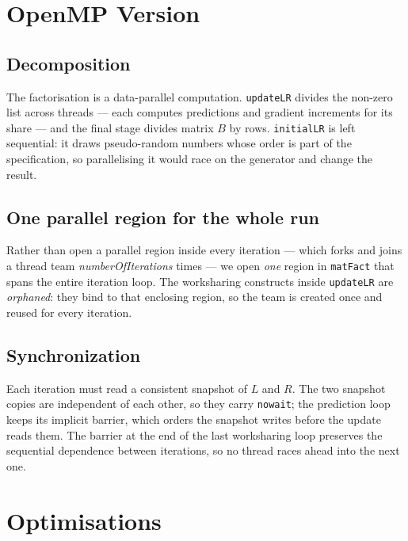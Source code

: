 \documentclass[twocolumn]{article}
\begin{document}
    \section{OpenMP Version}\label{sec:openmp-version}

    \subsection{Decomposition}
    \label{subsec:decompostions}
    The factorisation is a data-parallel computation. \texttt{updateLR} divides the
    non-zero list across threads --- each computes predictions and gradient increments
    for its share --- and the final stage divides matrix $B$ by rows. \texttt{initialLR}
    is left sequential: it draws pseudo-random numbers whose order is part of the
    specification, so parallelising it would race on the generator and change the result.

    \subsection{One parallel region for the whole run}
    \label{subsec:single-region}
    Rather than open a parallel region inside every iteration --- which forks and joins a
    thread team \emph{numberOfIterations} times --- we open \emph{one} region in
    \texttt{matFact} that spans the entire iteration loop. The worksharing constructs
    inside \texttt{updateLR} are \emph{orphaned}: they bind to that enclosing region, so
    the team is created once and reused for every iteration.

    \subsection{Synchronization}
    \label{subsec:synchronization}
    Each iteration must read a consistent snapshot of $L$ and $R$. The two snapshot
    copies are independent of each other, so they carry \texttt{nowait}; the prediction
    loop keeps its implicit barrier, which orders the snapshot writes before the update
    reads them. The barrier at the end of the last worksharing loop preserves the
    sequential dependence between iterations, so no thread races ahead into the next one.


    \section{Optimisations} \label{sec:optimisations}
\end{document}
